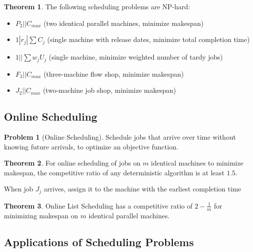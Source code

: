 \documentclass{article}
\theoremstyle{definition}
\newtheorem{problem}{Problem}
\newtheorem{theorem}{Theorem}
\begin{document}
\begin{theorem}
The following scheduling problems are NP-hard:
\begin{itemize}
    \item $P_2||C_{max}$ (two identical parallel machines, minimize makespan)
    \item $1|r_j|\sum C_j$ (single machine with release dates, minimize total completion time)
    \item $1||\sum w_j U_j$ (single machine, minimize weighted number of tardy jobs)
    \item $F_3||C_{max}$ (three-machine flow shop, minimize makespan)
    \item $J_2||C_{max}$ (two-machine job shop, minimize makespan)
\end{itemize}
\end{theorem}

\subsection*{Online Scheduling}

\begin{problem}[Online Scheduling]
Schedule jobs that arrive over time without knowing future arrivals, to optimize an objective function.
\end{problem}

\begin{theorem}
For online scheduling of jobs on $m$ identical machines to minimize makespan, the competitive ratio of any deterministic algorithm is at least $1.5$.
\end{theorem}

\begin{algorithm}[H]
\caption{Online List Scheduling}
\begin{algorithmic}[1]
\State When job $J_j$ arrives, assign it to the machine with the earliest completion time
\end{algorithmic}
\end{algorithm}

\begin{theorem}
Online List Scheduling has a competitive ratio of $2 - \frac{1}{m}$ for minimizing makespan on $m$ identical parallel machines.
\end{theorem}

\subsection*{Applications of Scheduling Problems}
\end{document}
